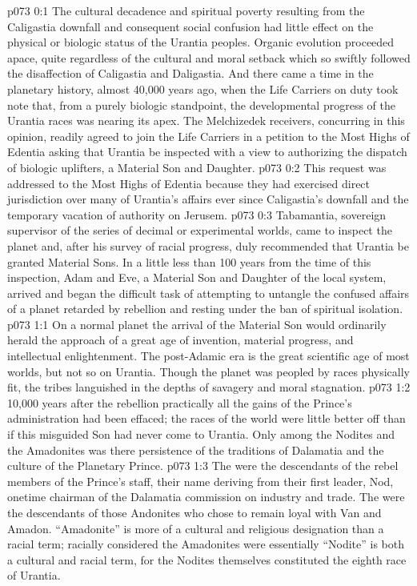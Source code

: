 \author{Solonia}
\vs p073 0:1 The cultural decadence and spiritual poverty resulting from the Caligastia downfall and consequent social confusion had little effect on the physical or biologic status of the Urantia peoples. Organic evolution proceeded apace, quite regardless of the cultural and moral setback which so swiftly followed the disaffection of Caligastia and Daligastia. And there came a time in the planetary history, almost 40,000 years ago, when the Life Carriers on duty took note that, from a purely biologic standpoint, the developmental progress of the Urantia races was nearing its apex. The Melchizedek receivers, concurring in this opinion, readily agreed to join the Life Carriers in a petition to the Most Highs of Edentia asking that Urantia be inspected with a view to authorizing the dispatch of biologic uplifters, a Material Son and Daughter.
\vs p073 0:2 This request was addressed to the Most Highs of Edentia because they had exercised direct jurisdiction over many of Urantia’s affairs ever since Caligastia’s downfall and the temporary vacation of authority on Jerusem.
\vs p073 0:3 Tabamantia, sovereign supervisor of the series of decimal or experimental worlds, came to inspect the planet and, after his survey of racial progress, duly recommended that Urantia be granted Material Sons. In a little less than 100 years from the time of this inspection, Adam and Eve, a Material Son and Daughter of the local system, arrived and began the difficult task of attempting to untangle the confused affairs of a planet retarded by rebellion and resting under the ban of spiritual isolation.
\vs p073 1:1 On a normal planet the arrival of the Material Son would ordinarily herald the approach of a great age of invention, material progress, and intellectual enlightenment. The post\hyp{}Adamic era is the great scientific age of most worlds, but not so on Urantia. Though the planet was peopled by races physically fit, the tribes languished in the depths of savagery and moral stagnation.
\vs p073 1:2 10,000 years after the rebellion practically all the gains of the Prince’s administration had been effaced; the races of the world were little better off than if this misguided Son had never come to Urantia. Only among the Nodites and the Amadonites was there persistence of the traditions of Dalamatia and the culture of the Planetary Prince.
\vs p073 1:3 The  were the descendants of the rebel members of the Prince’s staff, their name deriving from their first leader, Nod, onetime chairman of the Dalamatia commission on industry and trade. The  were the descendants of those Andonites who chose to remain loyal with Van and Amadon. “Amadonite” is more of a cultural and religious designation than a racial term; racially considered the Amadonites were essentially  “Nodite” is both a cultural and racial term, for the Nodites themselves constituted the eighth race of Urantia.
